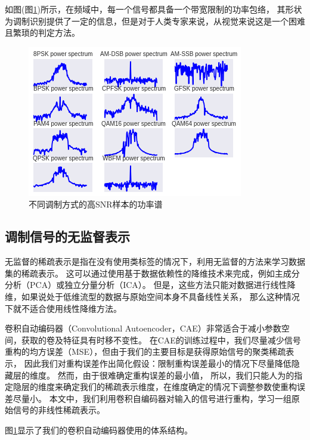 如图(图\ref{sec:fig_3_2})所示，在频域中，每一个信号都具备一个带宽限制的功率包络，
其形状为调制识别提供了一定的信息，但是对于人类专家来说，从视觉来说这是一个困难且繁琐的判定方法。\par
\begin{figure}[!h]
	\centering
	\includegraphics[scale=0.9]{figures/chapter_3/signal_view_2}
	\caption{不同调制方式的高SNR样本的功率谱}\label{sec:fig_3_2}
\end{figure}

\subsection{调制信号的无监督表示}

无监督的稀疏表示是指在没有使用类标签的情况下，利用无监督的方法来学习数据集的稀疏表示。
这可以通过使用基于数据依赖性的降维技术来完成，例如主成分分析（PCA）或独立分量分析（ICA）。
但是，这些方法只能对数据进行线性降维，如果说处于低维流型的数据与原始空间本身不具备线性关系，
那么这种情况下就不适合使用线性降维方法。\par

卷积自动编码器（Convolutional Autoencoder，CAE）非常适合于减小参数空间，获取的卷及特征具有时移不变性。
在CAE的训练过程中，我们尽量减少信号重构的均方误差（MSE），但由于我们的主要目标是获得原始信号的聚类稀疏表示，
因此我们对重构误差作出简化假设：限制重构误差最小的情况下尽量降低隐藏层的维度。
然而，由于很难确定重构误差的最小值，
所以，我们只能人为的指定隐层的维度来确定我们的稀疏表示维度，在维度确定的情况下调整参数使重构误差尽量小。
本文中，我们利用卷积自编码器对输入的信号进行重构，学习一组原始信号的非线性稀疏表示。\par
图\ref{sec:fig_3_2}显示了我们的卷积自动编码器使用的体系结构。\par

